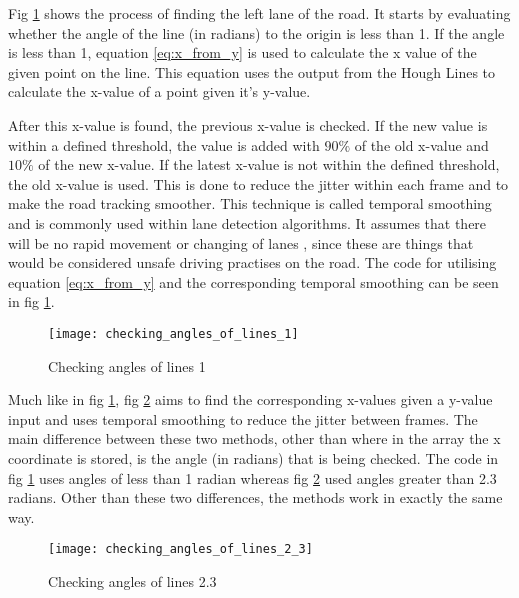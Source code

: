 \documentclass[conference]{IEEEtran}
\begin{document}
Fig \ref{fig:checking_angles_of_lines_1} shows the process of finding the left lane of the road. It starts by evaluating whether the angle of the line (in radians) to the origin is less than 1. If the angle is less than 1, equation \ref{eq:x_from_y} is used to calculate the x value of the given point on the line. This equation uses the output from the Hough Lines to calculate the x-value of a point given it's y-value. 

After this x-value is found, the previous x-value is checked. If the new value is within a defined threshold, the value is added with $90\%$ of the old x-value and $10\%$ of the new x-value. If the latest x-value is not within the defined threshold, the old x-value is used. This is done to reduce the jitter within each frame and to make the road tracking smoother. This technique is called temporal smoothing \cite{temporal_smoothing} and is commonly used within lane detection algorithms. It assumes that there will be no rapid movement or changing of lanes \cite{deeplane}, since these are things that would be considered unsafe driving practises on the road. The code for utilising equation \ref{eq:x_from_y} and the corresponding temporal smoothing can be seen in fig \ref{fig:checking_angles_of_lines_1}.

\begin{figure}[H]
\centerline{\texttt{[image: checking\_angles\_of\_lines\_1]}}
\caption{Checking angles of lines 1}
\label{fig:checking_angles_of_lines_1}
\end{figure}

Much like in fig \ref{fig:checking_angles_of_lines_1}, fig \ref{fig:checking_angles_of_lines_2.3} aims to find the corresponding x-values given a y-value input and uses temporal smoothing to reduce the jitter between frames. The main difference between these two methods, other than where in the array the x coordinate is stored, is the angle (in radians) that is being checked. The code in fig \ref{fig:checking_angles_of_lines_1} uses angles of less than 1 radian whereas fig \ref{fig:checking_angles_of_lines_2.3} used angles greater than 2.3 radians. Other than these two differences, the methods work in exactly the same way. 

\begin{figure}[H]
\centerline{\texttt{[image: checking\_angles\_of\_lines\_2\_3]}}
\caption{Checking angles of lines 2.3}
\label{fig:checking_angles_of_lines_2.3}
\end{figure}
\end{document}
